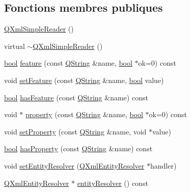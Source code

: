 \subsection*{Fonctions membres publiques}
\begin{DoxyCompactItemize}
\item 
\hyperlink{class_q_xml_simple_reader_a4ec163c0a75baf6d86d7124550740372}{Q\+Xml\+Simple\+Reader} ()
\item 
virtual \hyperlink{class_q_xml_simple_reader_a9dba2992f2ef5fe07cd4846dfca0fbc6}{$\sim$\+Q\+Xml\+Simple\+Reader} ()
\item 
\hyperlink{qglobal_8h_a1062901a7428fdd9c7f180f5e01ea056}{bool} \hyperlink{class_q_xml_simple_reader_ad672434d0a0915d50f31d8202c88ca44}{feature} (const \hyperlink{class_q_string}{Q\+String} \&name, \hyperlink{qglobal_8h_a1062901a7428fdd9c7f180f5e01ea056}{bool} $\ast$ok=0) const 
\item 
void \hyperlink{class_q_xml_simple_reader_a7e435e46bfe139249be78d89a89ff629}{set\+Feature} (const \hyperlink{class_q_string}{Q\+String} \&name, \hyperlink{qglobal_8h_a1062901a7428fdd9c7f180f5e01ea056}{bool} value)
\item 
\hyperlink{qglobal_8h_a1062901a7428fdd9c7f180f5e01ea056}{bool} \hyperlink{class_q_xml_simple_reader_af5903466bbb5bebc3cc4038987a6c18d}{has\+Feature} (const \hyperlink{class_q_string}{Q\+String} \&name) const 
\item 
void $\ast$ \hyperlink{class_q_xml_simple_reader_a96d8a8e1e2d3e565a4f0eddc23e13d69}{property} (const \hyperlink{class_q_string}{Q\+String} \&name, \hyperlink{qglobal_8h_a1062901a7428fdd9c7f180f5e01ea056}{bool} $\ast$ok=0) const 
\item 
void \hyperlink{class_q_xml_simple_reader_abd76c9f09aac5584602b7dd440a9074a}{set\+Property} (const \hyperlink{class_q_string}{Q\+String} \&name, void $\ast$value)
\item 
\hyperlink{qglobal_8h_a1062901a7428fdd9c7f180f5e01ea056}{bool} \hyperlink{class_q_xml_simple_reader_af3b476df286c4200917c8173114bb462}{has\+Property} (const \hyperlink{class_q_string}{Q\+String} \&name) const 
\item 
void \hyperlink{class_q_xml_simple_reader_a48dc90b8bdb4e1a0f8474079443f71b0}{set\+Entity\+Resolver} (\hyperlink{class_q_xml_entity_resolver}{Q\+Xml\+Entity\+Resolver} $\ast$handler)
\item 
\hyperlink{class_q_xml_entity_resolver}{Q\+Xml\+Entity\+Resolver} $\ast$ \hyperlink{class_q_xml_simple_reader_ae7224e14af6fc66325ab43085f36e6f4}{entity\+Resolver} () const 

\end{DoxyCompactItemize}
